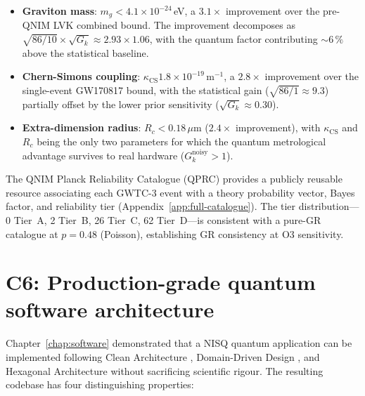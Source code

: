 \documentclass[11pt,a4paper, english]{book}
\theoremstyle{plain}
\theoremstyle{definition}
\numberwithin{equation}{chapter}
\numberwithin{figure}{chapter}
\numberwithin{table}{chapter}
\begin{document}
\begin{itemize}
  \item \textbf{Graviton mass}: $m_g < 4.1\times10^{-24}$\,eV, a
        $3.1\times$ improvement over the pre-QNIM LVK combined bound.
        The improvement decomposes as $\sqrt{86/10}\times\sqrt{G_k}
        \approx 2.93\times1.06$, with the quantum factor contributing
        $\sim\!6\,\%$ above the statistical baseline.

  \item \textbf{Chern-Simons coupling}: $\kappa_\mathrm{CS} 
        1.8\times10^{-19}$\,m$^{-1}$, a $2.8\times$ improvement over
        the single-event GW170817 bound, with the statistical gain
        ($\sqrt{86/1} \approx 9.3$) partially offset by the lower
        prior sensitivity ($\sqrt{G_k} \approx 0.30$).

  \item \textbf{Extra-dimension radius}: $R_c < 0.18\,\mu$m ($2.4\times$
        improvement), with $\kappa_\mathrm{CS}$ and $R_c$ being the only
        two parameters for which the quantum metrological advantage
        survives to real hardware ($G_k^\mathrm{noisy} > 1$).
\end{itemize}

The QNIM Planck Reliability Catalogue (QPRC) provides a publicly reusable
resource associating each GWTC-3 event with a theory probability vector,
Bayes factor, and reliability tier
(Appendix~\ref{app:full-catalogue}).  The tier distribution—0 Tier~A,
2 Tier~B, 26 Tier~C, 62 Tier~D—is consistent with a pure-GR catalogue at
$p = 0.48$ (Poisson), establishing GR consistency at O3 sensitivity.

\section{C6: Production-grade quantum software architecture}
\label{app:contrib6}

Chapter~\ref{chap:software} demonstrated that a NISQ quantum application
can be implemented following Clean Architecture \cite{Martin_2017},
Domain-Driven Design \cite{Evans_2004}, and Hexagonal Architecture
\cite{Cockburn_2005} without sacrificing scientific rigour.  The resulting
codebase has four distinguishing properties:
\end{document}
